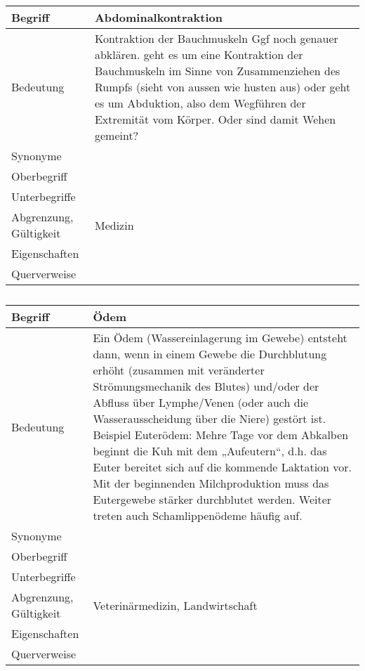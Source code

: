 \begin{table}[h]
	\centering	
	\begin{tabular}{ p{4.5cm} p{10.5cm} } 
		\toprule[1pt]
		\rowcolor{maroon!30}
		
		\textbf{Begriff} &  \textbf{Abdominalkontraktion} \\		
		\midrule
		
		Bedeutung  & Kontraktion  der Bauchmuskeln \cellcolor[RGB]{255, 255, 0} Ggf noch genauer abklären. geht es um eine Kontraktion der Bauchmuskeln im Sinne von Zusammenziehen des Rumpfs (sieht von aussen wie husten aus) oder geht es um Abduktion, also dem Wegführen der Extremität vom Körper. Oder sind damit Wehen gemeint? \\		
		Synonyme  & \\				
		Oberbegriff  &  \\		
		Unterbegriffe   &\\		
		Abgrenzung, Gültigkeit  & Medizin\\				
		Eigenschaften  & \\				
		Querverweise  & \\	
		\bottomrule				
		
	\end{tabular}
	\label{tab: Glossareintrag zu Abdominalkontraktion}
	\caption{}
\end{table}


\begin{table}[h]
	\centering	
	\begin{tabular}{ p{4.5cm} p{10.5cm} } 
		\toprule[1pt]
		\rowcolor{maroon!30}
		
		\textbf{Begriff} &  \textbf{Ödem} \\
		\midrule
				
		Bedeutung  & Ein Ödem (Wassereinlagerung im Gewebe) entsteht dann, wenn in einem Gewebe die Durchblutung erhöht (zusammen mit veränderter Strömungsmechanik des Blutes)  und/oder der Abfluss über Lymphe/Venen (oder auch die Wasserausscheidung über die Niere) gestört ist.
		Beispiel Euterödem: Mehre Tage vor dem Abkalben beginnt die Kuh mit dem „Aufeutern“, d.h. das Euter bereitet sich auf die kommende Laktation vor. Mit der beginnenden Milchproduktion muss das Eutergewebe stärker durchblutet werden. \cite{Swissgenetics} Weiter treten auch Schamlippenödeme häufig auf.\\		
		Synonyme  &  \\			
		Oberbegriff  &  \\		
		Unterbegriffe   & \\		
		Abgrenzung, Gültigkeit  & Veterinärmedizin, Landwirtschaft\\				
		Eigenschaften  & \\				
		Querverweise  & \\	
		\bottomrule				
		
	\end{tabular}
	\label{tab: Glossareintrag zu Ödem}
	\caption{}
\end{table}

